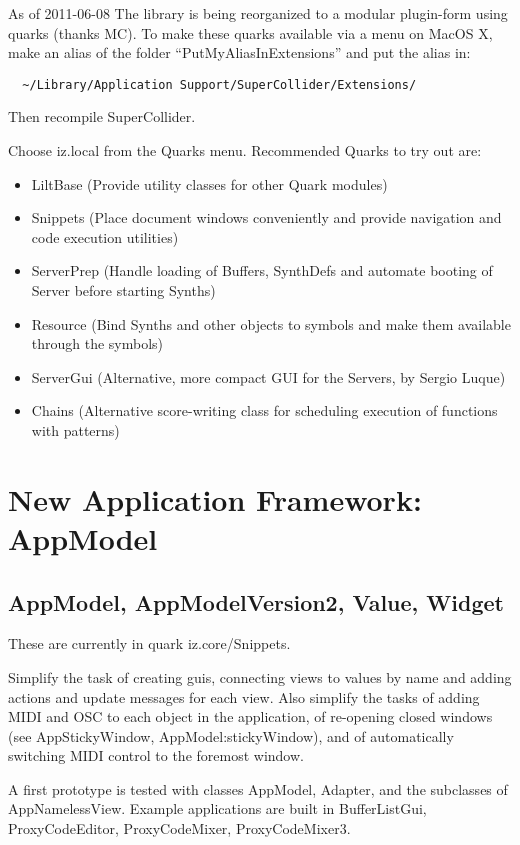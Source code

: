 \documentclass[11pt, a4paper]{scrartcl}
\begin{document}
As of 2011-06-08 The library is being reorganized to a modular plugin-form using quarks (thanks MC). To make these quarks available via a menu on MacOS X, make an alias of the folder ``PutMyAliasInExtensions'' and put the alias in:

\begin{verbatim}
  ~/Library/Application Support/SuperCollider/Extensions/
\end{verbatim}


Then recompile SuperCollider. 

Choose iz.local from the Quarks menu.  Recommended Quarks to try out are: 

\begin{itemize}
\item LiltBase (Provide utility classes for other Quark modules)
\item Snippets (Place document windows conveniently and provide navigation and code execution utilities)
\item ServerPrep (Handle loading of Buffers, SynthDefs and automate booting of Server before starting Synths)
\item Resource (Bind Synths and other objects to symbols and make them available through the symbols)
\item ServerGui (Alternative, more compact GUI for the Servers, by Sergio Luque)
\item Chains (Alternative score-writing class for scheduling execution of functions with patterns)
\end{itemize}
\section*{New Application Framework: AppModel}
\label{sec-6}
\subsection*{AppModel, AppModelVersion2, Value, Widget}
\label{sec-6_1}


These are currently in quark iz.core/Snippets. 

Simplify the task of creating guis, connecting views to values by name and adding actions and update messages for each view.  Also simplify the tasks of adding MIDI and OSC to each object in the application, of re-opening closed windows (see AppStickyWindow, AppModel:stickyWindow), and of automatically switching MIDI control to the foremost window. 

A first prototype is tested with classes AppModel, Adapter, and the subclasses of AppNamelessView.  Example applications are built in BufferListGui, ProxyCodeEditor, ProxyCodeMixer, ProxyCodeMixer3.
\end{document}
